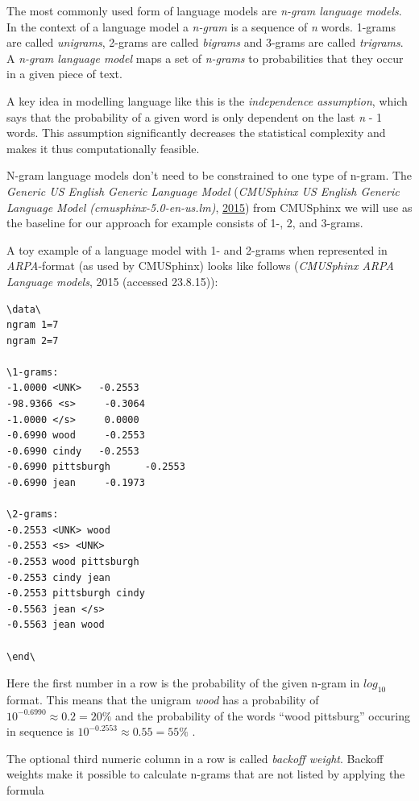\documentclass[]{article}
\begin{document}
The most commonly used form of language models are \emph{n-gram language
models}. In the context of a language model a \emph{n-gram} is a
sequence of \emph{n} words. 1-grams are called \emph{unigrams}, 2-grams
are called \emph{bigrams} and 3-grams are called \emph{trigrams}. A
\emph{n-gram language model} maps a set of \emph{n-grams} to
probabilities that they occur in a given piece of text.

A key idea in modelling language like this is the \emph{independence
assumption}, which says that the probability of a given word is only
dependent on the last \emph{n} - 1 words. This assumption significantly
decreases the statistical complexity and makes it thus computationally
feasible.

N-gram language models don't need to be constrained to one type of
n-gram. The \emph{Generic US English Generic Language Model}
(\emph{CMUSphinx US English Generic Language Model
(cmusphinx-5.0-en-us.lm)}, \hyperref[ref-cmuLm]{2015}) from CMUSphinx we
will use as the baseline for our approach for example consists of 1-, 2,
and 3-grams.

A toy example of a language model with 1- and 2-grams when represented
in \emph{ARPA}-format (as used by CMUSphinx) looks like follows
(\emph{CMUSphinx ARPA Language models}, 2015 (accessed 23.8.15)):

\begin{verbatim}
\data\
ngram 1=7
ngram 2=7

\1-grams:
-1.0000 <UNK>   -0.2553
-98.9366 <s>     -0.3064
-1.0000 </s>     0.0000
-0.6990 wood     -0.2553
-0.6990 cindy   -0.2553
-0.6990 pittsburgh      -0.2553
-0.6990 jean     -0.1973

\2-grams:
-0.2553 <UNK> wood
-0.2553 <s> <UNK>
-0.2553 wood pittsburgh
-0.2553 cindy jean
-0.2553 pittsburgh cindy
-0.5563 jean </s>
-0.5563 jean wood

\end\
\end{verbatim}

Here the first number in a row is the probability of the given n-gram in
\(log_{10}\) format. This means that the unigram \emph{wood} has a
probability of \(10^{-0.6990} \approx 0.2 = 20\%\) and the probability
of the words ``wood pittsburg'' occuring in sequence is
\(10^{-0.2553} \approx 0.55 = 55\%\) .

The optional third numeric column in a row is called \emph{backoff
weight}. Backoff weights make it possible to calculate n-grams that are
not listed by applying the formula
\end{document}
